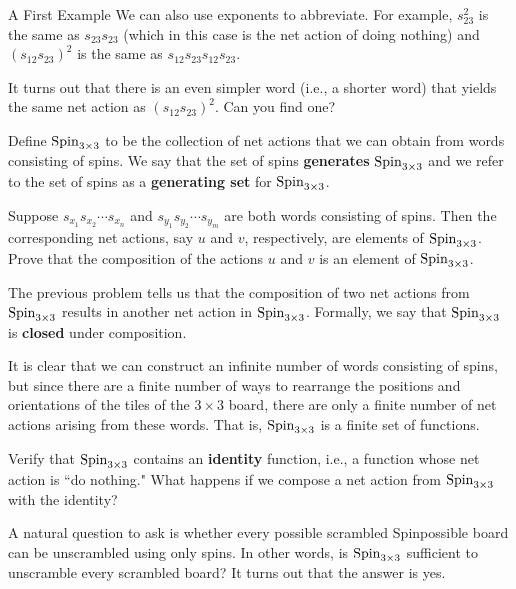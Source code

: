\begin{section}{A First Example}
We can also use exponents to abbreviate.  For example, $s_{23}^2$ is the same as $s_{23} s_{23}$ (which in this case is the net action of doing nothing) and $(s_{12} s_{23})^2$ is the same as $s_{12} s_{23} s_{12} s_{23}$.

\begin{problem}\label{prob:braid_relation}
It turns out that there is an even simpler word (i.e., a shorter word) that yields the same net action as $(s_{12} s_{23})^2$. Can you find one?
\end{problem}

Define $\operatorname{Spin}_{3\times 3}$ to be the collection of net actions that we can obtain from words consisting of spins.  We say that the set of spins \textbf{generates} $\operatorname{Spin}_{3\times 3}$ and we refer to the set of spins as a \textbf{generating set} for $\operatorname{Spin}_{3\times 3}$.  

\begin{problem}
Suppose $s_{x_1}s_{x_2}\cdots s_{x_n}$ and $s_{y_1}s_{y_2}\cdots s_{y_m}$ are both words consisting of spins. Then the corresponding net actions, say $u$ and $v$, respectively, are elements of $\operatorname{Spin}_{3\times 3}$. Prove that the composition of the actions $u$ and $v$ is an element of $\operatorname{Spin}_{3\times 3}$.
\end{problem}

The previous problem tells us that the composition of two net actions from $\operatorname{Spin}_{3\times 3}$ results in another net action in $\operatorname{Spin}_{3\times 3}$. Formally, we say that $\operatorname{Spin}_{3\times 3}$ is \textbf{closed} under composition.

It is clear that we can construct an infinite number of words consisting of spins, but since there are a finite number of ways to rearrange the positions and orientations of the tiles of the $3\times 3$ board, there are only a finite number of net actions arising from these words.  That is, $\operatorname{Spin}_{3\times 3}$ is a finite set of functions.

\begin{problem}
Verify that $\operatorname{Spin}_{3\times 3}$ contains an \textbf{identity} function, i.e., a function whose net action is ``do nothing." What happens if we compose a net action from $\operatorname{Spin}_{3\times 3}$ with the identity?
\end{problem}

A natural question to ask is whether every possible scrambled Spinpossible board can be unscrambled using only spins.  In other words, is $\operatorname{Spin}_{3\times 3}$ sufficient to unscramble every scrambled board? It turns out that the answer is yes.


\end{section}
